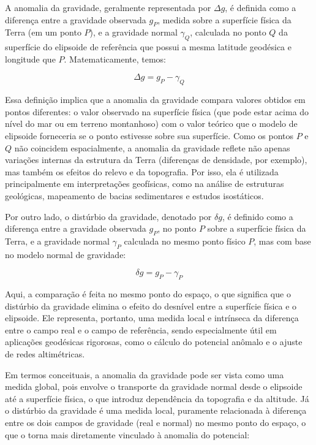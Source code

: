 A anomalia da gravidade, geralmente representada por \( \Delta g \), é definida como a diferença entre a gravidade observada \( g_P \), medida sobre a superfície física da Terra (em um ponto \( P \)), e a gravidade normal \( \gamma_Q \), calculada no ponto \( Q \) da superfície do elipsoide de referência que possui a mesma latitude geodésica e longitude que \( P \). Matematicamente, temos:

\[
\Delta g = g_P - \gamma_Q
\]

Essa definição implica que a anomalia da gravidade compara valores obtidos em pontos diferentes: o valor observado na superfície física (que pode estar acima do nível do mar ou em terreno montanhoso) com o valor teórico que o modelo de elipsoide forneceria se o ponto estivesse sobre sua superfície. Como os pontos \( P \) e \( Q \) não coincidem espacialmente, a anomalia da gravidade reflete não apenas variações internas da estrutura da Terra (diferenças de densidade, por exemplo), mas também os efeitos do relevo e da topografia. Por isso, ela é utilizada principalmente em interpretações geofísicas, como na análise de estruturas geológicas, mapeamento de bacias sedimentares e estudos isostáticos.

Por outro lado, o distúrbio da gravidade, denotado por \( \delta g \), é definido como a diferença entre a gravidade observada \( g_P \), no ponto \( P \) sobre a superfície física da Terra, e a gravidade normal \( \gamma_P \) calculada no mesmo ponto físico \( P \), mas com base no modelo normal de gravidade:

\[
\delta g = g_P - \gamma_P
\]

Aqui, a comparação é feita no mesmo ponto do espaço, o que significa que o distúrbio da gravidade elimina o efeito do desnível entre a superfície física e o elipsoide. Ele representa, portanto, uma medida local e intrínseca da diferença entre o campo real e o campo de referência, sendo especialmente útil em aplicações geodésicas rigorosas, como o cálculo do potencial anômalo e o ajuste de redes altimétricas.

Em termos conceituais, a anomalia da gravidade pode ser vista como uma medida global, pois envolve o transporte da gravidade normal desde o elipsoide até a superfície física, o que introduz dependência da topografia e da altitude. Já o distúrbio da gravidade é uma medida local, puramente relacionada à diferença entre os dois campos de gravidade (real e normal) no mesmo ponto do espaço, o que o torna mais diretamente vinculado à anomalia do potencial:

